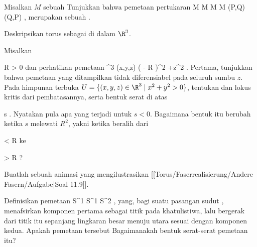 {}
{

Misalkan $M$ sebuah
Tunjukkan bahwa pemetaan pertukaran
\maabbeledisp {} {M \times M} { M \times M
} {(P,Q)} {(Q,P)
} {,}
merupakan sebuah
.

}
{} {}

{}
{

Deskripsikan torus
 sebagai
di dalam $\R^3$.

}
{} {}

{}
{

Misalkan

\mavergleichskette
{\vergleichskette
{ R
}
{ > }{ 0
}
{  }{
}
{    }{
}
{   }{
}
}
{}{}{}
dan perhatikan pemetaan
\maabbeledisp {} { \R^3} { \R
} { (x,y,z) } { \left(  - R  \right)^2 +z^2
} {.}
Pertama, tunjukkan bahwa pemetaan yang ditampilkan tidak diferensiabel pada seluruh sumbu $z$. Pada himpunan terbuka
$U=\{(x,y,z)\in\R^3\mid x^2+y^2>0\}$, tentukan
dan lokus kritis dari pembatasannya, serta bentuk serat di atas

\mavergleichskette
{\vergleichskette
{ s
}
{ \in }{ \R
}
{  }{
}
{    }{
}
{   }{
}
}
{}{}{.}
Nyatakan pula apa yang terjadi untuk $s<0$. Bagaimana bentuk itu berubah ketika $s$ melewati $R^2$, yakni ketika beralih dari

\mavergleichskette
{\vergleichskette
{ 
}
{ < }{ R
}
{  }{
}
{    }{
}
{   }{
}
}
{}{}{}
ke

\mavergleichskette
{\vergleichskette
{ 
}
{ > }{ R
}
{  }{
}
{    }{
}
{   }{
}
}
{}{}{?}

}
{} {}

{}
{

Buatlah sebuah animasi yang mengilustrasikan
[[Torus/Faserrealisierung/Andere Fasern/Aufgabe|Soal 11.9]].

}
{} {}

{}
{

Definisikan pemetaan
\maabbdisp {} {S^1 \times S^1} { S^2
} {,}
yang, bagi suatu pasangan sudut
\mathl{(\alpha, \beta)}{}, menafsirkan komponen pertama sebagai titik pada khatulistiwa, lalu bergerak dari titik itu sepanjang lingkaran besar menuju utara sesuai dengan komponen kedua. Apakah pemetaan tersebut
Bagaimanakah bentuk serat-serat pemetaan itu?

}
{} {}

